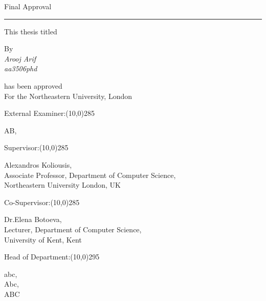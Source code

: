 
\begin{center}

\Large Final Approval
\end{center}
\noindent\rule{15.5cm}{3pt}

\begin{center}
\normalsize
 This thesis titled\\
\end{center}


\begin{center}
\large {}
\end{center}

\vfill
\begin{center}
By\\
\emph{Arooj Arif\\
aa3506phd}
\end{center}


\begin{center}\normalsize
has been approved\\
For the Northeastern University, London
\end{center}

%


\vfill
\normalsize
External Examiner:\line(10,0){285}
\vspace{-0.50cm}
\begin{center}\normalsize
AB,\\

\end{center}

\vfill
\normalsize
Supervisor:\line(10,0){285}
\vspace{-0.50cm}
\begin{center}\normalsize
Alexandros Koliousis,\\
Associate Professor, Department of Computer Science,\\
Northeastern University London, UK
\end{center}

\vfill
\normalsize
Co-Supervisor:\line(10,0){285}
\vspace{-0.50cm}
\begin{center}\normalsize
Dr.Elena Botoeva, \\
Lecturer, Department of Computer Science,\\
University of Kent, Kent
\end{center}


\vfill
\vfill

\normalsize
Head of Department:\line(10,0){295}
\vspace{-0.50cm}
\begin{center}\normalsize
abc,\\
Abc,\\
ABC
\end{center}


